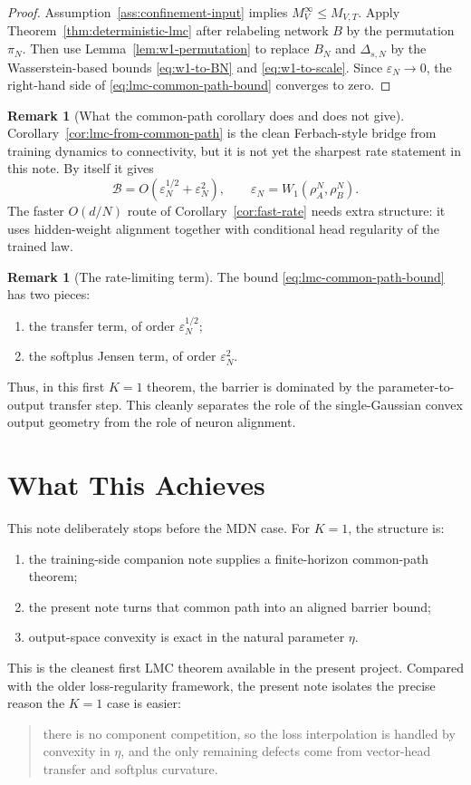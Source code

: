\documentclass[11pt]{article}
\theoremstyle{definition}
\newtheorem{remark}[theorem]{Remark}
\newcommand{\cB}{\mathcal{B}}
\begin{document}
\begin{proof}
Assumption~\ref{ass:confinement-input} implies $M_V^\infty\le M_{V,T}$.
Apply Theorem~\ref{thm:deterministic-lmc} after relabeling network $B$ by the
permutation $\pi_N$. Then use Lemma~\ref{lem:w1-permutation} to replace $B_N$
and $\Delta_{s,N}$ by the Wasserstein-based bounds \eqref{eq:w1-to-BN} and
\eqref{eq:w1-to-scale}. Since $\varepsilon_N\to 0$, the right-hand side of
\eqref{eq:lmc-common-path-bound} converges to zero.
\end{proof}

\begin{remark}[What the common-path corollary does and does not give]
Corollary~\ref{cor:lmc-from-common-path} is the clean Ferbach-style bridge from
training dynamics to connectivity, but it is not yet the sharpest rate
statement in this note. By itself it gives
\[
  \cB = O(\varepsilon_N^{1/2}+\varepsilon_N^2),
  \qquad
  \varepsilon_N=W_1(\rho_A^N,\rho_B^N).
\]
The faster $O(d/N)$ route of Corollary~\ref{cor:fast-rate} needs extra
structure: it uses hidden-weight alignment together with conditional head
regularity of the trained law.
\end{remark}

\begin{remark}[The rate-limiting term]
The bound \eqref{eq:lmc-common-path-bound} has two pieces:
\begin{enumerate}[label=(\alph*)]
  \item the transfer term, of order $\varepsilon_N^{1/2}$;
  \item the softplus Jensen term, of order $\varepsilon_N^2$.
\end{enumerate}
Thus, in this first $K=1$ theorem, the barrier is dominated by the
parameter-to-output transfer step. This cleanly separates the role of the
single-Gaussian convex output geometry from the role of neuron alignment.
\end{remark}

\section{What This Achieves}

This note deliberately stops before the MDN case. For $K=1$, the structure is:
\begin{enumerate}[label=(\roman*)]
  \item the training-side companion note supplies a finite-horizon common-path
  theorem;
  \item the present note turns that common path into an aligned barrier bound;
  \item output-space convexity is exact in the natural parameter $\eta$.
\end{enumerate}

This is the cleanest first LMC theorem available in the present project.
Compared with the older loss-regularity framework, the present note isolates the
precise reason the $K=1$ case is easier:
\begin{quote}
there is no component competition, so the loss interpolation is handled by
convexity in $\eta$, and the only remaining defects come from vector-head
transfer and softplus curvature.
\end{quote}
\end{document}
